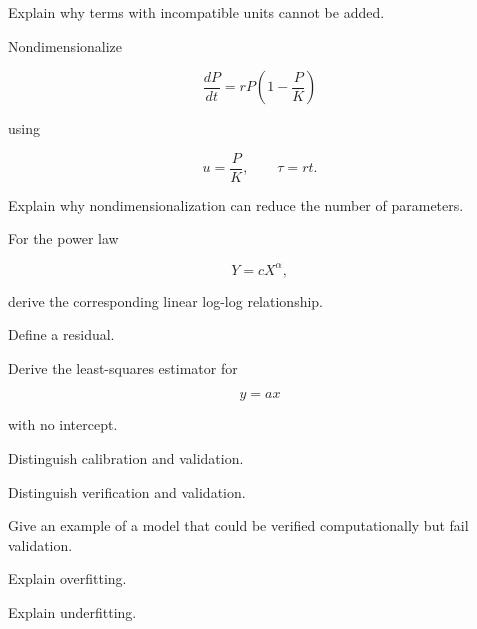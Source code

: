 \begin{exercise}[3]
Explain why terms with incompatible units cannot be added.
\end{exercise}

\begin{exercise}[3]
Nondimensionalize

\[
\frac{dP}{dt}
=
rP
\left(
1-\frac{P}{K}
\right)
\]

using

\[
u=\frac{P}{K},
\qquad
\tau=rt.
\]
\end{exercise}

\begin{exercise}[3]
Explain why nondimensionalization can reduce the number of parameters.
\end{exercise}

\begin{exercise}[2]
For the power law

\[
Y=cX^\alpha,
\]

derive the corresponding linear log-log relationship.
\end{exercise}

\begin{exercise}[2]
Define a residual.
\end{exercise}

\begin{exercise}[3]
Derive the least-squares estimator for

\[
y=ax
\]

with no intercept.
\end{exercise}

\begin{exercise}[2]
Distinguish calibration and validation.
\end{exercise}

\begin{exercise}[2]
Distinguish verification and validation.
\end{exercise}

\begin{exercise}[3]
Give an example of a model that could be verified computationally but fail
validation.
\end{exercise}

\begin{exercise}[3]
Explain overfitting.
\end{exercise}

\begin{exercise}[3]
Explain underfitting.
\end{exercise}

